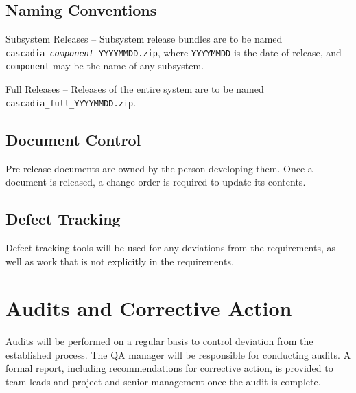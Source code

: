 \documentclass[11pt]{wacomepd}
\begin{document}
\section{Naming Conventions}
{\sc Subsystem Releases} -- Subsystem release bundles are to be named
{\tt cascadia\_\textit{component}\_YYYYMMDD.zip}, where {\tt YYYYMMDD} is the date of release,
and {\tt component} may be the name of any subsystem.

{\sc Full Releases} -- Releases of the entire system are to be named
\texttt{cascadia\_full\_YYYYMMDD.zip}.


\section{Document Control}
Pre-release documents are owned by the person developing them.  Once a document is released, a
change order is required to update its contents.


\section{Defect Tracking}
Defect tracking tools will be used for any deviations from the requirements, as well as work that is
not explicitly in the requirements.


\chapter{Audits and Corrective Action}

Audits will be performed on a regular basis to control deviation from the established process.  The
QA manager will be responsible for conducting audits.  A formal report, including recommendations
for corrective action, is provided to team leads and project and senior management once the audit is
complete.



\end{document}
